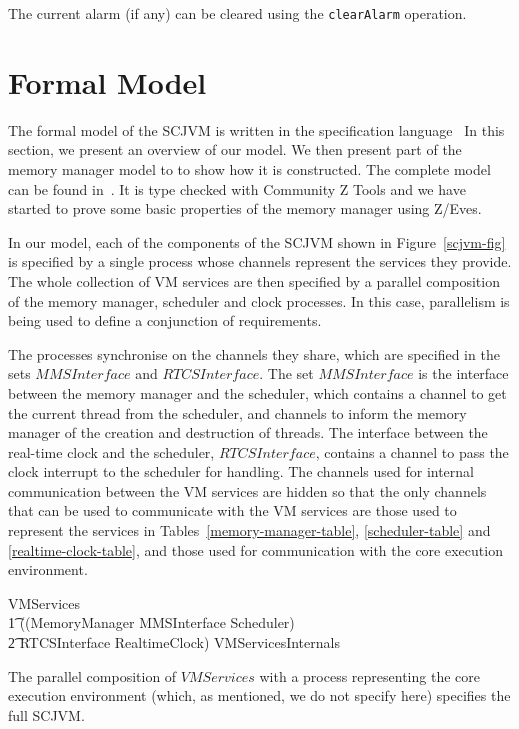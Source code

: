 \documentclass[a4paper,10pt]{report}
\begin{document}
The current alarm (if any) can be cleared using the
\texttt{clear\-Alarm} operation.

\section{Formal Model}
\label{formal-model-section}

The formal model of the SCJVM is written in the \Circus{}
specification language~\cite{oliveira2009} In this section, we present
an overview of our model.
We then present part of the memory manager model to to show how it is
constructed.
The complete model can be found in~\cite{baxter2015}.
It is type checked with Community Z Tools and we have started to prove
some basic properties of the memory manager using Z/Eves.

In our model, each of the components of the SCJVM shown in
Figure~\ref{scjvm-fig} is specified by a single process whose channels
represent the services they provide.
The whole collection of VM services are then specified by a parallel
composition of the memory manager, scheduler and clock processes.
In this case, parallelism is being used to define a conjunction of
requirements. 

The processes synchronise on the channels they share, which are
specified in the sets $MMSInterface$ and $RTCSInterface$.
The set $MMSInterface$ is the interface between the memory manager and
the scheduler, which contains a channel to get the current thread from
the scheduler, and channels to inform the memory manager of the
creation and destruction of threads.
The interface between the real-time clock and the scheduler,
$RTCSInterface$, contains a channel to pass the clock interrupt to the
scheduler for handling.
The channels used for internal communication between the VM services
are hidden so that the only channels that can be used to communicate
with the VM services are those used to represent the services in
Tables~\ref{memory-manager-table}, \ref{scheduler-table} and
\ref{realtime-clock-table}, and those used for communication with the
core execution environment.
%
\begin{circus}
  VMServices \circdef \\
  \t1 ((MemoryManager \lpar MMSInterface \rpar Scheduler) \\
  \t2 \lpar RTCSInterface \rpar RealtimeClock) \circhide
  VMServicesInternals
\end{circus}
%
The parallel composition of $VMServices$ with a process representing
the core execution environment (which, as mentioned, we do not specify
here) specifies the full SCJVM.
\end{document}

